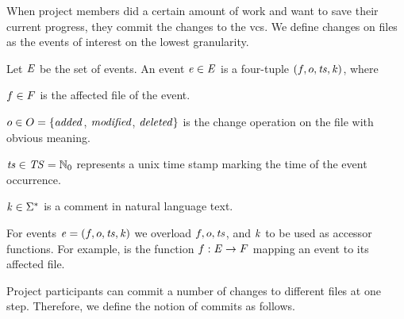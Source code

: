 When project members did a certain amount of work and want to save their current progress, they commit the changes to the \gls{vcs}.
We define changes on files as the events of interest on the lowest granularity.
\begin{definition}[Event] \label{def:events}
Let $\mathit{E}$ %
be the set of events. An event $\mathit{e} \in \mathit{E}$ is a four-tuple $(f, o, \mathit{ts}, \mathit{k})$, where
\begin{compactitem}
  \item $f \in F$ is the affected file of the event.
  \item $o \in O =\lbrace\mathit{added}$, $\mathit{modified}$, $\mathit{deleted} \rbrace$ is the change operation on the file with obvious meaning.
  \item $\mathit{ts} \in \mathit{TS} = \mathbb{N}_0$ represents a unix time stamp marking the time of the event occurrence.
  \item $\mathit{k} \in \Sigma^*$ is a comment in natural language text.
\end{compactitem}
\end{definition}

For events $\event = (\file, \changeOperation, \timestamp, \comment%
)$ we overload $f, o, \mathit{ts}$, and $\mathit{k}$
to be used as accessor functions. For example, \file is the function $f : \mathit{E} \rightarrow F$ mapping an event to its affected file.

Project participants can commit a number of changes to different files at one step. Therefore, we define the notion of commits as follows.


